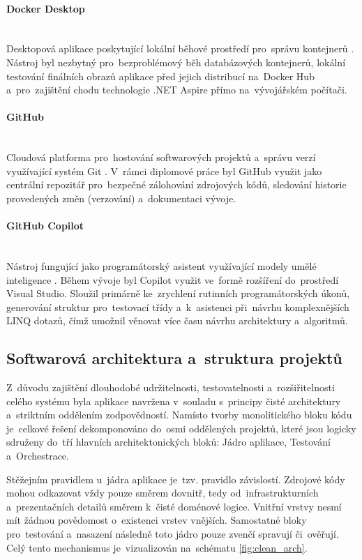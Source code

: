 \documentclass[
  master,
  program=ainfvs,
  printversion,
  figures=false,
  tables=false,
  glossaries,
  index
]{kidiplom}
\begin{document}
\paragraph{Docker Desktop} \mbox{} \\
Desktopová aplikace poskytující lokální běhové prostředí pro~správu kontejnerů \cite{docker_desktop_docs}. Nástroj byl nezbytný pro~bezproblémový běh databázových kontejnerů, lokální testování finálních obrazů aplikace před jejich distribucí na~Docker Hub a~pro~zajištění chodu technologie .NET Aspire přímo na~vývojářském počítači.

\paragraph{GitHub} \mbox{} \\
Cloudová platforma pro~hostování softwarových projektů a~správu verzí využívající systém Git \cite{github_docs}. V~rámci diplomové práce byl GitHub využit jako centrální repozitář pro~bezpečné zálohování zdrojových kódů, sledování historie provedených změn (verzování) a~dokumentaci vývoje.

\paragraph{GitHub Copilot} \mbox{} \\ \label{par:gc}
Nástroj fungující jako programátorský asistent využívající modely umělé inteligence \cite{copilot_docs}. Během vývoje byl Copilot využit ve~formě rozšíření do~prostředí Visual Studio. Sloužil primárně ke~zrychlení rutinních programátorských úkonů, generování struktur pro~testovací třídy a~k~asistenci při~návrhu komplexnějších LINQ dotazů, čímž umožnil věnovat více času návrhu architektury a~algoritmů.

\subsection{Softwarová architektura a~struktura projektů}
Z~důvodu zajištění dlouhodobé udržitelnosti, testovatelnosti a~rozšiřitelnosti celého systému byla aplikace navržena v~souladu s~principy čisté architektury a~striktním oddělením zodpovědností. Namísto tvorby monolitického bloku kódu je~celkové řešení dekomponováno do~osmi oddělených projektů, které jsou logicky sdruženy do~tří hlavních architektonických bloků: Jádro aplikace, Testování a~Orchestrace.

Stěžejním pravidlem u~jádra aplikace je~tzv. pravidlo závislostí. Zdrojové kódy mohou odkazovat vždy pouze směrem dovnitř, tedy od~infrastrukturních a~prezentačních detailů směrem k~čisté doménové logice. Vnitřní vrstvy nesmí mít žádnou povědomost o~existenci vrstev vnějších. Samostatné bloky pro~testování a~nasazení následně toto jádro pouze zvenčí spravují či~ověřují. Celý tento mechanismus je~vizualizován na~schématu \ref{fig:clean_arch}.
\end{document}
